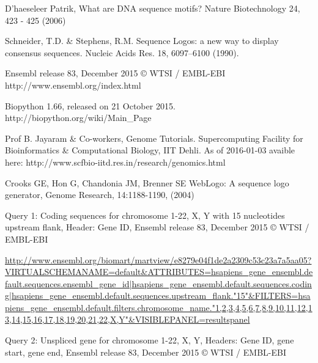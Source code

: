 \documentclass[10pt,letterpaper]{article}
\begin{document}
\nolinenumbers

%
%
% 
\begin{thebibliography}{10}

D'haeseleer Patrik, What are DNA sequence motifs? Nature Biotechnology 24, 423 - 425 (2006)

Schneider, T.D. \& Stephens, R.M. Sequence Logos: a new way to display consensus sequences. Nucleic Acids Res. 18, 6097–6100 (1990).

Ensembl release 83, December 2015 © WTSI / EMBL-EBI
http://www.ensembl.org/index.html

Biopython 1.66, released on 21 October 2015.
http://biopython.org/wiki/Main\_Page

Prof B. Jayaram \& Co-workers, Genome Tutorials. Supercomputing Facility for Bioinformatics \& Computational Biology, IIT Dehli.
As of 2016-01-03 avaible here:
http://www.scfbio-iitd.res.in/research/genomics.html

Crooks GE, Hon G, Chandonia JM, Brenner SE WebLogo: A sequence logo generator, Genome Research, 14:1188-1190, (2004)

Query 1: Coding sequences for chromosome 1-22, X, Y with 15 nucleotides upstream flank, Header: Gene ID, Ensembl release 83, December 2015 © WTSI / EMBL-EBI

\url{http://www.ensembl.org/biomart/martview/e8279e04f1de2a2309c53c23a7a5aa05?VIRTUALSCHEMANAME=default&ATTRIBUTES=hsapiens_gene_ensembl.default.sequences.ensembl_gene_id|hsapiens_gene_ensembl.default.sequences.coding|hsapiens_gene_ensembl.default.sequences.upstream_flank."15"&FILTERS=hsapiens_gene_ensembl.default.filters.chromosome_name."1,2,3,4,5,6,7,8,9,10,11,12,13,14,15,16,17,18,19,20,21,22,X,Y"&VISIBLEPANEL=resultspanel}

Query 2: Unspliced gene for chromosome 1-22, X, Y, Headers: Gene ID, gene start, gene end, Ensembl release 83, December 2015 © WTSI / EMBL-EBI


\end{thebibliography}
\end{document}
